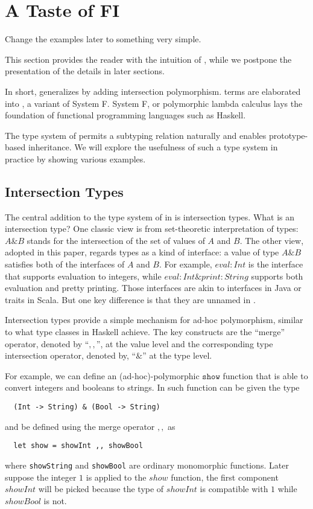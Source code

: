 \section{A Taste of FI}

\begin{footnote}
  Change the examples later to something very simple.
\end{footnote}

This section provides the reader with the intuition of \FIend, while we postpone
the presentation of the details in later sections.

In short, \FI generalizes \Fend by adding intersection polymorphism. \FI terms
are elaborated into \Fend, a variant of System F. System F, or polymorphic
lambda calculus lays the foundation of functional programming languages such as
Haskell.

The type system of \FI permits a subtyping relation naturally and enables
prototype-based inheritance. We will explore the usefulness of such a type
system in practice by showing various examples.

\subsection{Intersection Types}

The central addition to the type system of \F in \FI is intersection types. What
is an intersection type? One classic view is from set-theoretic interpretation
of types: $ A \& B $ stands for the intersection of the set of values of $ A $
and $ B $. The other view, adopted in this paper, regards types as a kind of
interface: a value of type $ A \& B $ satisfies both of the interfaces of $ A $
and $ B $. For example, $ { eval : Int } $ is the interface that supports
evaluation to integers, while $ { eval : Int } \& { print : String } $ supports
both evaluation and pretty printing. Those interfaces are akin to interfaces in
Java or traits in Scala. But one key difference is that they are unnamed in
\FIend.

Intersection types provide a simple mechanism for ad-hoc polymorphism, similar
to what type classes in Haskell achieve. The key constructs are the ``merge''
operator, denoted by ``$ ,, $'', at the value level and the corresponding type
intersection operator, denoted by, ``$ \& $'' at the type level.

For example, we can define an (ad-hoc)-polymorphic $ \texttt{show} $ function
that is able to convert integers and booleans to strings. In \FI such function
can be given the type
\begin{lstlisting}
  (Int -> String) & (Bool -> String)
\end{lstlisting}
and be defined using the merge operator $ ,, $ as
\begin{lstlisting}
  let show = showInt ,, showBool
\end{lstlisting}
where \texttt{showString} and \texttt{showBool} are ordinary monomorphic
functions. Later suppose the integer $ 1 $ is applied to the $ show $ function,
the first component $ showInt $ will be picked because the type of $ showInt $
is compatible with $ 1 $ while $ showBool $ is not.

